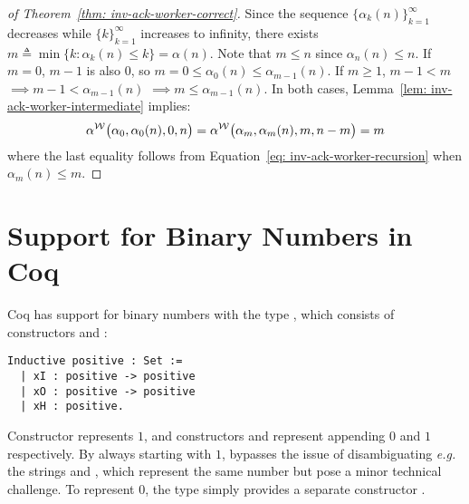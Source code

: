 \begin{proof}[of Theorem~\ref{thm: inv-ack-worker-correct}]
	Since the sequence $\big\{\alpha_k(n)\big\}_{k=1}^{\infty}$ decreases while $\{k\}_{k=1}^{\infty}$ increases to infinity, there exists $m \triangleq \min\big\{k : \alpha_k(n) \le k \} = \alpha(n)$. Note that $m\le n$ since $\alpha_n(n)\le n$.
	If $m = 0$, $m - 1$ is also $0$, so $m = 0 \le \alpha_0(n)\le \alpha_{m-1}(n)$. If $m \ge 1$, $m - 1 < m$ $\implies m - 1 < \alpha_{m-1}(n)$ $\implies m \le \alpha_{m-1}(n)$. In both cases, Lemma~\ref{lem: inv-ack-worker-intermediate} implies:
	$$ \alpha^{\mathcal{W}}\big(\alpha_0, \alpha_0(n), 0, n\big) = \alpha^{\mathcal{W}}\big(\alpha_m, \alpha_m(n), m, n - m\big) = m $$
	where the last equality follows from Equation~\ref{eq: inv-ack-worker-recursion} when $\alpha_m(n)\le m$.
\end{proof}

\section{Support for Binary Numbers in Coq}
\label{apx:bin_in_coq}
Coq has support for binary numbers with the type , which consists
of constructors  and :

\begin{lstlisting}
Inductive positive : Set :=
  | xI : positive -> positive 
  | xO : positive -> positive
  | xH : positive.
\end{lstlisting}

Constructor  represents $1$, and constructors  and  represent
appending $0$ and $1$ respectively.
By always starting with $1$,  bypasses
the issue of disambiguating \emph{e.g.} the strings  and
, which represent the same number but pose
a minor technical challenge.
To represent $0$, the type  simply provides a separate constructor .

